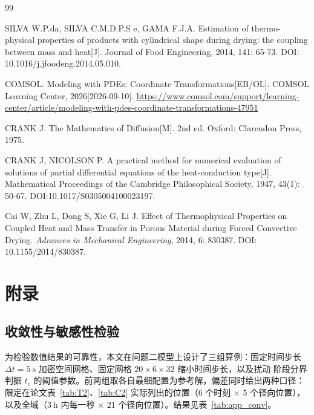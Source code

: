 \documentclass[12pt,a4paper]{ctexart}
\begin{document}
\begin{thebibliography}{99}

\raggedright

SILVA W.P.da, SILVA C.M.D.P.S e, GAMA F.J.A. Estimation of thermo-
physical properties of products with cylindrical shape during drying: the coupling between mass and heat[J]. 
Journal of Food Engineering, 2014, 141: 65-73. DOI: 10.1016/j.jfoodeng.2014.05.010.

COMSOL. Modeling with PDEs: Coordinate Transformations[EB/OL].
COMSOL Learning Center, 2026[2026-09-10].
\url{https://www.comsol.com/support/learning-center/article/modeling-with-pdes-coordinate-transformations-47951}

CRANK J.
The Mathematics of Diffusion[M].
2nd ed. Oxford: Clarendon Press, 1975.

CRANK J, NICOLSON P. A practical method for numerical evaluation of solutions of partial differential equations of the heat-conduction type[J]. Mathematical Proceedings of the Cambridge Philosophical Society, 1947, 43(1): 50-67. DOI:10.1017/S0305004100023197.

Cai W, Zhu L, Dong S, Xie G, Li J.
Effect of Thermophysical Properties on Coupled Heat and Mass Transfer
in Porous Material during Forced Convective Drying.
\textit{Advances in Mechanical Engineering}, 2014, 6: 830387.
DOI: 10.1155/2014/830387.

\end{thebibliography}

\clearpage
\appendix
\section{附录}
\renewcommand{\thesubsection}{\thesection.\arabic{subsection}}

\subsection{收敛性与敏感性检验}
\label{app:conv}

为检验数值结果的可靠性，本文在问题二模型上设计了三组算例：固定时间步长
$\Delta t=5\ \mathrm{s}$ 加密空间网格、固定网格 $20\times6\times32$ 缩小时间步长，以及扰动
阶段分界判据 $t_c$ 的阈值参数。前两组取各自最细配置为参考解，偏差同时给出两种口径：
限定在论文表~\ref{tab:T2}、\ref{tab:C2} 实际列出的位置（$6$ 个时刻 $\times$ $5$ 个径向位置），
以及全域（$3\ \mathrm{h}$ 内每一秒 $\times$ $21$ 个径向位置）。结果见表~\ref{tab:app_conv}。
\end{document}
